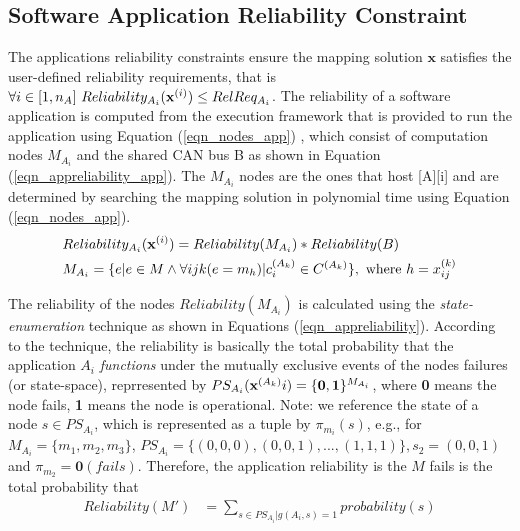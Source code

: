 \subsection{Software Application Reliability Constraint}\label{subsec_reliability_constraint}
The applications reliability constraints ensure the mapping solution $\textbf{x}$ satisfies the user-defined reliability requirements, that is $ \forall i\in [1,n_A]\ Reliability_{A_i}(\textbf{x}^{(i)})\leq RelReq_{A_i}$. 
The reliability of a software application is computed from the execution framework that is provided to run the application using Equation (\ref{eqn_nodes_app}) , which consist of computation nodes $M_{A_i}$ and the shared CAN bus B as shown in Equation (\ref{eqn_appreliability_app}). The $M_{A_i}$ nodes are the ones that host [A][i] and are determined by searching the mapping solution in polynomial time using Equation (\ref{eqn_nodes_app}).
\begin{align}
	\label{eqn_appreliability_app}
	&Reliability_{A_i}(\ttbspx{i})=Reliability(M_{A_i})*Reliability(B)\\
	\label{eqn_nodes_app}
	&M_{A_i}=\{e|e\in M \land \forall ijk (e=m_h)|\ttsss{c}\in \ttssp{C} \},\mbox{ where } h=\ttssx{k}{ij} 
\end{align}

The reliability of the nodes $Reliability(M_{A_i})$ is calculated using the \textit{state-enumeration} technique \cite{Lucet1999ExactReliability}  as shown in Equations (\ref{eqn_appreliability}). According to the technique, the reliability is basically the total probability that the application $A_i$ \textit{functions} under the mutually exclusive events of the nodes failures  (or state-space), reprresented by $PS_{A_i}(\textbf{x}^{(A_k)}{i})=\{\textbf{0},\textbf{1}\}^{M_{A_i}}$, where  \textbf{0} means the node fails, \textbf{1} means the node is operational. Note: we reference the state of a node $s\in PS_{A_i}$, which is represented as a tuple by $\pi_{m_i}(s)$, e.g., for $M_{A_i}=\{m_1,m_2,m_3\}$,  $PS_{A_i}=\{(0,0,0),(0,0,1),...,(1,1,1)\},s_2=(0,0,1)$ and $\pi_{m_2}=\textbf{0}(fails)$. Therefore, the application reliability is the $M$ fails is the total probability that 
\begin{align}
\label{eqn_appreliability}
Reliability(M')&=\sum_{s\in PS_{A_i}|g(A_i, s)=1}probability(s)
\end{align}

